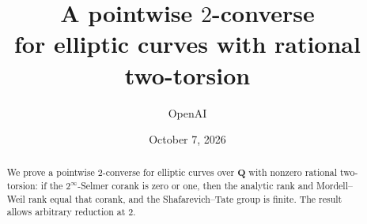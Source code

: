 \documentclass[11pt]{article}
\title{A pointwise $2$-converse\\for elliptic curves with rational two-torsion}
\author{OpenAI}
\date{October 7, 2026}
\numberwithin{equation}{section}
\theoremstyle{definition}
\theoremstyle{remark}
\begin{document}
\maketitle
\begin{abstract}
We prove a pointwise $2$-converse for elliptic curves over $\mathbf Q$
with nonzero rational two-torsion: if the $2^\infty$-Selmer corank is
zero or one, then the analytic rank and Mordell--Weil rank equal that
corank, and the Shafarevich--Tate group is finite. The result allows
arbitrary reduction at $2$.
\end{abstract}
\setcounter{tocdepth}{1}
\tableofcontents
\clearpage











\end{document}
